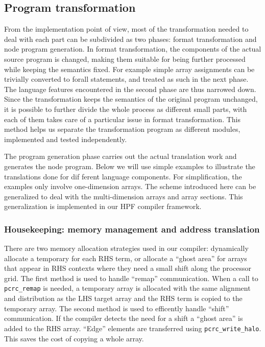 \subsection{Program transformation}

From the implementation point of view, most of the transformation
needed to deal with each part can be subdivided as two phases: format
transformation and node program generation.  In format transformation,
the components of the actual source program is changed, making them
suitable for being further processed while keeping the semantics
fixed.  For example simple array assignments can be trivially converted
to forall statements, and treated as such in the next phase.  The
language features encountered in the second phase are thus narrowed
down.  Since the transformation keeps the semantics of the original program
unchanged, it is possible to further divide the whole process as
different small parts, with each of them takes care of a particular
issue in format transformation. This method helps us separate the
transformation program as different modules, implemented and tested
independently.

The program generation phase carries out the actual translation
work and generates the node program.  Below we will use
simple examples to illustrate the translations done for dif ferent
language components.  For simplification, the examples only involve
one-dimension arrays.  The scheme introduced here can be generalized to
deal with the multi-dimension arrays and array sections.  This
generalization is implemented in our HPF compiler framework.

\subsubsection*{Housekeeping: memory management and address translation}

There are two memory allocation strategies used in our compiler:
dynamically allocate a temporary for each RHS term, or allocate a
``ghost area'' for arrays that appear in RHS contexts where they need a
small shift along the processor grid.  The first method is used to
handle ``remap'' communication.  When a call to {\tt pcrc\_remap} is
needed, a temporary array is allocated with the same alignment and
distribution as the LHS target array and the RHS term is copied to the
temporary array.
The second method is used to efficently handle ``shift'' communication.
If the compiler detects the need for a shift
a ``ghost area'' is added to the RHS array.
``Edge'' elements are transferred using {\tt pcrc\_write\_halo}.
This saves the cost of copying a whole array.

